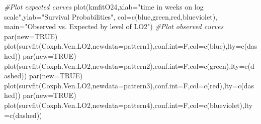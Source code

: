 \documentclass[
]{article}
\newenvironment{Shaded}{\begin{snugshade}}{\end{snugshade}}
\newcommand{\AttributeTok}[1]{\textcolor[rgb]{0.77,0.63,0.00}{#1}}
\newcommand{\CommentTok}[1]{\textcolor[rgb]{0.56,0.35,0.01}{\textit{#1}}}
\newcommand{\ConstantTok}[1]{\textcolor[rgb]{0.00,0.00,0.00}{#1}}
\newcommand{\FunctionTok}[1]{\textcolor[rgb]{0.00,0.00,0.00}{#1}}
\newcommand{\NormalTok}[1]{#1}
\newcommand{\StringTok}[1]{\textcolor[rgb]{0.31,0.60,0.02}{#1}}
\begin{document}
\begin{Shaded}
\begin{Highlighting}[]
\CommentTok{\#Plot expected curves}
\FunctionTok{plot}\NormalTok{(kmfitO24,}\AttributeTok{xlab=}\StringTok{"time in weeks on log scale"}\NormalTok{,}\AttributeTok{ylab=}\StringTok{"Survival Probabilities"}\NormalTok{, }\AttributeTok{col=}\FunctionTok{c}\NormalTok{(}\StringTok{\textquotesingle{}blue\textquotesingle{}}\NormalTok{,}\StringTok{\textquotesingle{}green\textquotesingle{}}\NormalTok{,}\StringTok{\textquotesingle{}red\textquotesingle{}}\NormalTok{,}\StringTok{\textquotesingle{}blueviolet\textquotesingle{}}\NormalTok{), }\AttributeTok{main=}\StringTok{"Observed vs. Expected by level of LO2"}\NormalTok{)}
\CommentTok{\#Plot observed curves}
\FunctionTok{par}\NormalTok{(}\AttributeTok{new=}\ConstantTok{TRUE}\NormalTok{)}
\FunctionTok{plot}\NormalTok{(}\FunctionTok{survfit}\NormalTok{(Coxph.Ven.LO2,}\AttributeTok{newdata=}\NormalTok{pattern1),}\AttributeTok{conf.int=}\NormalTok{F,}\AttributeTok{col=}\FunctionTok{c}\NormalTok{(}\StringTok{\textquotesingle{}blue\textquotesingle{}}\NormalTok{),}\AttributeTok{lty=}\FunctionTok{c}\NormalTok{(}\StringTok{\textquotesingle{}dashed\textquotesingle{}}\NormalTok{))}
\FunctionTok{par}\NormalTok{(}\AttributeTok{new=}\ConstantTok{TRUE}\NormalTok{)  }
\FunctionTok{plot}\NormalTok{(}\FunctionTok{survfit}\NormalTok{(Coxph.Ven.LO2,}\AttributeTok{newdata=}\NormalTok{pattern2),}\AttributeTok{conf.int=}\NormalTok{F,}\AttributeTok{col=}\FunctionTok{c}\NormalTok{(}\StringTok{\textquotesingle{}green\textquotesingle{}}\NormalTok{),}\AttributeTok{lty=}\FunctionTok{c}\NormalTok{(}\StringTok{\textquotesingle{}dashed\textquotesingle{}}\NormalTok{))}
\FunctionTok{par}\NormalTok{(}\AttributeTok{new=}\ConstantTok{TRUE}\NormalTok{)}
\FunctionTok{plot}\NormalTok{(}\FunctionTok{survfit}\NormalTok{(Coxph.Ven.LO2,}\AttributeTok{newdata=}\NormalTok{pattern3),}\AttributeTok{conf.int=}\NormalTok{F,}\AttributeTok{col=}\FunctionTok{c}\NormalTok{(}\StringTok{\textquotesingle{}red\textquotesingle{}}\NormalTok{),}\AttributeTok{lty=}\FunctionTok{c}\NormalTok{(}\StringTok{\textquotesingle{}dashed\textquotesingle{}}\NormalTok{))}
\FunctionTok{par}\NormalTok{(}\AttributeTok{new=}\ConstantTok{TRUE}\NormalTok{)}
\FunctionTok{plot}\NormalTok{(}\FunctionTok{survfit}\NormalTok{(Coxph.Ven.LO2,}\AttributeTok{newdata=}\NormalTok{pattern4),}\AttributeTok{conf.int=}\NormalTok{F,}\AttributeTok{col=}\FunctionTok{c}\NormalTok{(}\StringTok{\textquotesingle{}blueviolet\textquotesingle{}}\NormalTok{),}\AttributeTok{lty=}\FunctionTok{c}\NormalTok{(}\StringTok{\textquotesingle{}dashed\textquotesingle{}}\NormalTok{))}

\end{Highlighting}
\end{Shaded}
\end{document}
